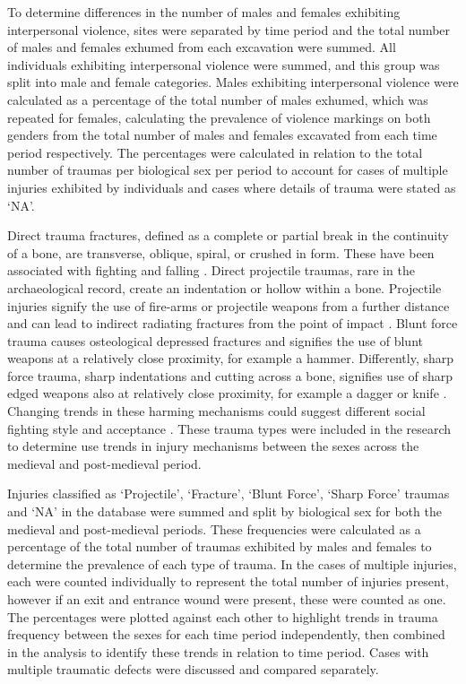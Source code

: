 %
To determine differences in the number of males and females exhibiting interpersonal violence, sites were separated by time period and the total number of males and females exhumed from each excavation were summed. All individuals exhibiting interpersonal violence were summed, and this group was split into male and female categories. Males exhibiting interpersonal violence were calculated as a percentage of the total number of males exhumed, which was repeated for females, calculating the prevalence of violence markings on both genders from the total number of males and females excavated from each time period respectively.  The percentages were calculated in relation to the total number of traumas per biological sex per period to account for cases of multiple injuries exhibited by individuals and cases where details of trauma were stated as ‘NA’.

%
Direct trauma fractures, defined as a complete or partial break in the continuity of a bone, are transverse, oblique, spiral, or crushed in form.  These have been associated with fighting and falling \parencites[141]{lovell1997}[110]{roberts2003}. 
Direct projectile traumas, rare in the archaeological record, create an indentation or hollow within a bone. Projectile injuries signify the use of fire-arms or projectile weapons from a further distance and can lead to indirect radiating fractures from the point of impact \parencite[110]{roberts2003}. 
Blunt force trauma causes osteological depressed fractures and signifies the use of blunt weapons at a relatively close proximity, for example a hammer. Differently, sharp force trauma, sharp indentations and cutting across a bone, signifies use of sharp edged weapons also at relatively close proximity, for example a dagger or knife \parencite[110]{roberts2003}. 
Changing trends in these harming mechanisms could suggest different social fighting style and acceptance \parencite[142]{lovell1997}. 
These trauma types were included in the research to determine use trends in injury mechanisms between the sexes across the medieval and post-medieval period.

Injuries classified as ‘Projectile’, ‘Fracture’, ‘Blunt Force’, ‘Sharp Force’ traumas and ‘NA’ in the  database were summed and split by biological sex for both the medieval and post-medieval periods. These frequencies were calculated as a percentage of the total number of traumas exhibited by males and females to determine the prevalence of each type of trauma. In the cases of multiple injuries, each were counted individually to represent the total number of injuries present, however if an exit and entrance wound were present, these were counted as one. The percentages were plotted against each other to highlight trends in trauma frequency between the sexes for each time period independently, then combined in the analysis to identify these trends in relation to time period.  Cases with multiple traumatic defects were discussed and compared separately.

